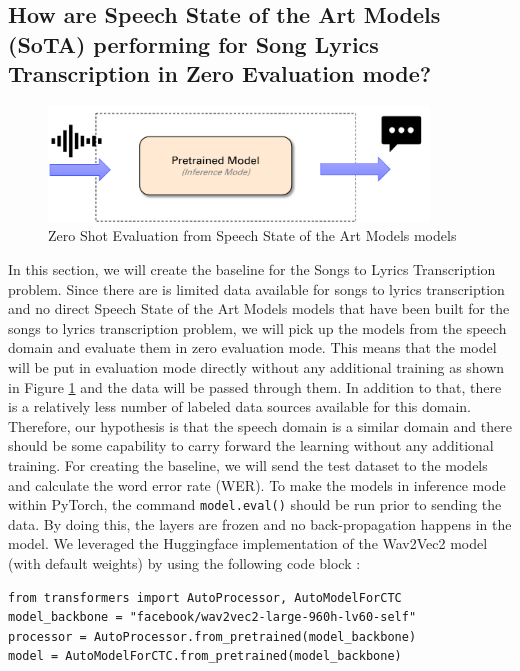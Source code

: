 \subsection{How are Speech State of the Art Models (SoTA) performing for Song Lyrics Transcription in Zero Evaluation mode?}

    \begin{figure} [H]
    \centering
    \includegraphics[width=0.9\textwidth]{05-research study/figures/zeroshot.pdf}
    \caption{Zero Shot Evaluation from Speech State of the Art Models  models}
    \label{fig:zeroshot}
\end{figure}

In this section, we will create the baseline for the Songs to Lyrics Transcription problem. Since there are is limited data available for songs to lyrics transcription and no direct Speech State of the Art Models  models that have been built for the songs to lyrics transcription problem, we will pick up the models from the speech domain and evaluate them in zero evaluation mode. This means that the model will be put in evaluation mode directly without any additional training as shown in Figure \ref{fig:zeroshot} and the data will be passed through them. In addition to that, there is a relatively less number of labeled data sources available for this domain. Therefore, our hypothesis is that the speech domain is a similar domain and there should be some capability to carry forward the learning without any additional training. For creating the baseline, we will send the test dataset to the models and calculate the word error rate (WER). To make the models in inference mode within PyTorch, the command \texttt{model.eval()} should be run prior to sending the data. By doing this, the layers are frozen and no back-propagation happens in the model. We leveraged the Huggingface implementation of the Wav2Vec2 model (with default weights) by using the following code block : \\
\begin{verbatim}
from transformers import AutoProcessor, AutoModelForCTC
model_backbone = "facebook/wav2vec2-large-960h-lv60-self"
processor = AutoProcessor.from_pretrained(model_backbone)
model = AutoModelForCTC.from_pretrained(model_backbone)
\end{verbatim} 

